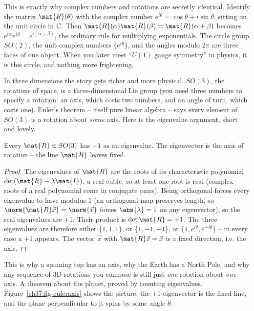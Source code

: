 \begin{connectionbox}
This is exactly why complex numbers and rotations are secretly identical. Identify
the matrix $\mat{R}(\theta)$ with the complex number $e^{i\theta} = \cos\theta +
i\sin\theta$, sitting on the unit circle in $\mathbb{C}$. Then $\mat{R}(\alpha)\mat{R}(\beta)
= \mat{R}(\alpha+\beta)$ becomes $e^{i\alpha}e^{i\beta} = e^{i(\alpha+\beta)}$, the
ordinary rule for multiplying exponentials. The circle group $SO(2)$, the unit
complex numbers $\{e^{i\theta}\}$, and the angles modulo $2\pi$ are three faces of
one object. When you later meet ``$U(1)$ gauge symmetry'' in physics, it is this
circle, and nothing more frightening.
\end{connectionbox}

In three dimensions the story gets richer and more physical. $SO(3)$, the rotations
of space, is a three-dimensional Lie group (you need three numbers to specify a
rotation: an axis, which costs two numbers, and an angle of turn, which costs one).
Euler's theorem -- itself pure linear algebra -- says every element of $SO(3)$ is a
rotation about \emph{some} axis. Here is the eigenvalue argument, short and lovely.

\begin{proposition}
\label{ch37:prop-euler}
Every $\mat{R}\in SO(3)$ has $+1$ as an eigenvalue. The eigenvector is the axis of
rotation -- the line $\mat{R}$ leaves fixed.
\end{proposition}

\begin{proof}
The eigenvalues of $\mat{R}$ are the roots of its characteristic polynomial
$\det(\mat{R}-\lambda\mat{I})$, a real cubic, so at least one root is real (complex
roots of a real polynomial come in conjugate pairs). Being orthogonal forces every
eigenvalue to have modulus $1$ (an orthogonal map preserves length, so
$\norm{\mat{R}\vec{x}}=\norm{\vec{x}}$ forces $\abs{\lambda}=1$ on any eigenvector),
so the real eigenvalues are $\pm 1$. Their product is $\det\mat{R}=+1$. The three
eigenvalues are therefore
either $\{1,1,1\}$, or $\{1,-1,-1\}$, or $\{1, e^{i\theta}, e^{-i\theta}\}$ -- in
every case a $+1$ appears. The vector $\vec{x}$ with $\mat{R}\vec{x}=\vec{x}$ is a
fixed direction, i.e. the axis.
\end{proof}

This is why a spinning top has an axis, why the Earth has a North Pole, and why
any sequence of 3D rotations you compose is still just \emph{one} rotation about
\emph{one} axis. A theorem about the planet, proved by counting eigenvalues.
Figure~\ref{ch37:fig-euleraxis} shows the picture: the $+1$-eigenvector is the
fixed line, and the plane perpendicular to it spins by some angle $\theta$.

